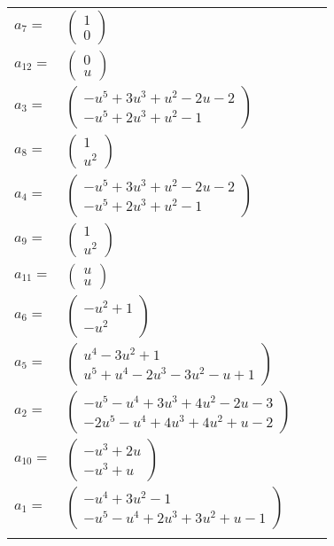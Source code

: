\documentclass[1p]{elsarticle_modified}
\theoremstyle{definition}
\begin{document}
\begin{tabular}{m{7pt} m{180pt} m{7pt} m{180pt} }
\flushright $a_{7}=$&$\begin{pmatrix}1\\0\end{pmatrix}$ \\
\flushright $a_{12}=$&$\begin{pmatrix}0\\u\end{pmatrix}$ \\
\flushright $a_{3}=$&$\begin{pmatrix}- u^5+3 u^3+u^2-2 u-2\\- u^5+2 u^3+u^2-1\end{pmatrix}$ \\
\flushright $a_{8}=$&$\begin{pmatrix}1\\u^2\end{pmatrix}$ \\
\flushright $a_{4}=$&$\begin{pmatrix}- u^5+3 u^3+u^2-2 u-2\\- u^5+2 u^3+u^2-1\end{pmatrix}$ \\
\flushright $a_{9}=$&$\begin{pmatrix}1\\u^2\end{pmatrix}$ \\
\flushright $a_{11}=$&$\begin{pmatrix}u\\u\end{pmatrix}$ \\
\flushright $a_{6}=$&$\begin{pmatrix}- u^2+1\\- u^2\end{pmatrix}$ \\
\flushright $a_{5}=$&$\begin{pmatrix}u^4-3 u^2+1\\u^5+u^4-2 u^3-3 u^2- u+1\end{pmatrix}$ \\
\flushright $a_{2}=$&$\begin{pmatrix}- u^5- u^4+3 u^3+4 u^2-2 u-3\\-2 u^5- u^4+4 u^3+4 u^2+u-2\end{pmatrix}$ \\
\flushright $a_{10}=$&$\begin{pmatrix}- u^3+2 u\\- u^3+u\end{pmatrix}$ \\
\flushright $a_{1}=$&$\begin{pmatrix}- u^4+3 u^2-1\\- u^5- u^4+2 u^3+3 u^2+u-1\end{pmatrix}$\\&\end{tabular}
\end{document}
